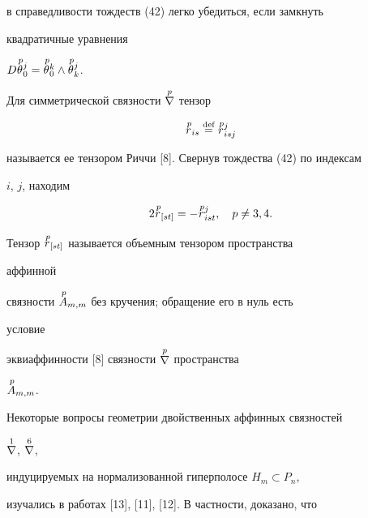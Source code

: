 в справедливости тождеств (42) легко убедиться, если замкнуть 


квадратичные уравнения 


$D\up{\,p}{\theta}^j_0=\up{\,p}{\theta}^k_0\wedge 


\up{\,p}{\theta}^j_k$. 


 


Для симметрической связности $\overset{p}{\nabla}{}$ тензор 


\begin{equation} 


\up{\,p}{r}_{is}\up{\text{def}}{=}\up{\,p}{r}^j_{is j} 


\end{equation} 


называется ее тензором Риччи [8]. Свернув тождества (42) по индексам  


$i$, $j$, находим 


\begin{equation} 


2\up{\,p}{r}_{[s t]}=-\up{\,p}{r}^j_{is t},\quad 


p\ne 3,4. 


\end{equation} 


Тензор $\overset{\,p}{r}{}_{[s t]}$ называется объемным тензором пространства 


аффинной 


связности $\overset{\,p}{A}{}_{m,m}$ без кручения; обращение его в нуль есть 


условие 


эквиаффинности [8] связности $\overset{p}{\nabla}{}$ пространства 


$\overset{\,p}{A}{}_{m,m}$. 


 


Некоторые вопросы геометрии двойственных аффинных связностей 


$\overset{1}{\nabla}{}$, $\overset{6}{\nabla}{}$, 


индуцируемых на нормализованной гиперполосе $H_m\subset P_n$, 


изучались в работах [13], [11], [12]. В частности, доказано, что 


